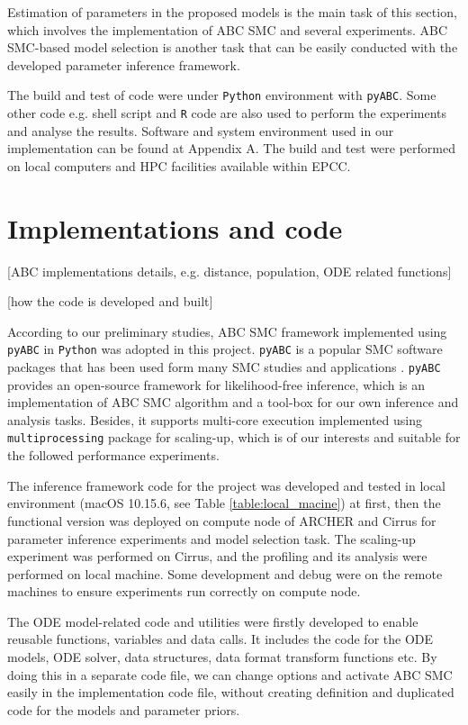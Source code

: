 \documentclass[12pt,a4paper]{report}
\begin{document}
Estimation of  parameters in the proposed models is the main task of this section, which involves the implementation of ABC SMC and several experiments. ABC SMC-based model selection is another task that can be easily conducted with the developed parameter inference framework.

The build and test of code were under \verb|Python| environment with \verb|pyABC|\cite{ref:pyabc}. Some other code e.g. shell script and \verb|R| code are also used to perform the experiments and analyse the results. Software and system environment used in our implementation can be found at Appendix A. The build and test were performed on local computers and HPC facilities available within EPCC.






\section{Implementations and code}

[ABC implementations details, e.g. distance, population, ODE related functions]

[how the code is developed and built]

According to our preliminary studies, ABC SMC framework implemented using \verb|pyABC| in \verb|Python| was adopted in this project. \verb|pyABC| is a popular SMC software packages \cite{ref:pyabc} that has been used form many SMC studies and applications \cite{ref:adpt_pop}. \verb|pyABC| provides an open-source framework for likelihood-free inference, which is an implementation of ABC SMC algorithm and a tool-box for our own inference and analysis tasks. Besides, it supports multi-core execution implemented using \verb|multiprocessing| package for scaling-up, which is of our interests and suitable for the followed performance experiments.

The inference framework code for the project was developed and tested in local environment (macOS 10.15.6, see Table \ref{table:local_macine}) at first, then the functional version was deployed on compute node of ARCHER and Cirrus for parameter inference experiments and model selection task. The scaling-up experiment was performed on Cirrus, and the profiling and its analysis were performed on local machine. Some development and debug were on the remote machines to ensure experiments run correctly on compute node.

The ODE model-related code and utilities were firstly developed to enable reusable functions, variables and data calls. It includes the code for the ODE models, ODE solver, data structures, data format transform functions etc. By doing this in a separate code file, we can change options and activate ABC SMC easily in the implementation code file, without creating definition and duplicated code for the models and parameter priors.
\end{document}
